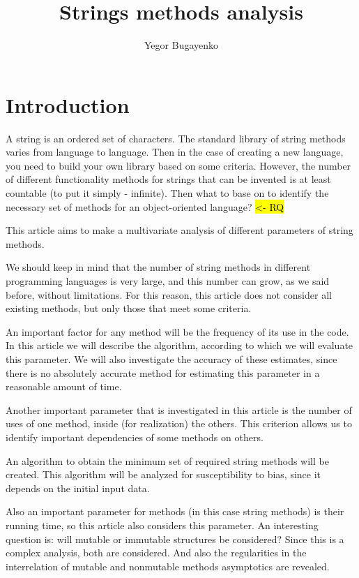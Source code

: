\documentclass[anonymous,sigplan,review,11pt,nonacm,natbib=false]{acmart}
\title{Strings methods analysis}
\author{Yegor Bugayenko}
\affiliation{Huawei\city{Moscow}\country{Russia}}
\begin{document}
\raggedbottom

\begin{abstract}
\end{abstract}

\maketitle

\section{Introduction}\label{sec:intro}

A string is an ordered set of characters. The standard library of string methods varies from language to language. Then in the case of creating a new language, you need to build your own library based on some criteria. However, the number of different functionality methods for strings that can be invented is at least countable (to put it simply - infinite). Then what to base on to identify the necessary set of methods for an object-oriented language? \hl{<- RQ}

This article aims to make a multivariate analysis of different parameters of string methods.

We should keep in mind that the number of string methods in different programming languages is very large, and this number can grow, as we said before, without limitations. For this reason, this article does not consider all existing methods, but only those that meet some criteria.

An important factor for any method will be the frequency of its use in the code. In this article we will describe the algorithm, according to which we will evaluate this parameter. We will also investigate the accuracy of these estimates, since there is no absolutely accurate method for estimating this parameter in a reasonable amount of time.

Another important parameter that is investigated in this article is the number of uses of one method, inside (for realization) the others. This criterion allows us to identify important dependencies of some methods on others.

An algorithm to obtain the minimum set of required string methods will be created. This algorithm will be analyzed for susceptibility to bias, since it depends on the initial input data.

Also an important parameter for methods (in this case string methods) is their running time, so this article also considers this parameter. An interesting question is: will mutable or immutable structures be considered? Since this is a complex analysis, both are considered. And also the regularities in the interrelation of mutable and nonmutable methods asymptotics are revealed.
\end{document}
